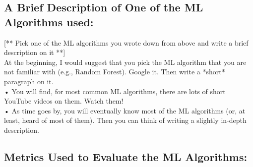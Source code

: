 \documentclass[]{article}
\begin{document}
\subsection*{A Brief Description of One of the ML Algorithms used:}
[** Pick one of the ML algorithms you wrote down from above and write a brief description on it **] \\
At the beginning, I would suggest that you pick the ML algorithm that you are not familiar with (e.g., Random Forest). Google it. Then write a *short* paragraph on it. \\
• You will find, for most common ML algorithms, there are lots of short YouTube videos on them. Watch them! \\
• As time goes by, you will eventually know most of the ML algorithms (or, at least, heard of most of them). Then you can think of writing a slightly in-depth description. 

\subsection*{Metrics Used to Evaluate the ML Algorithms:}
\end{document}
